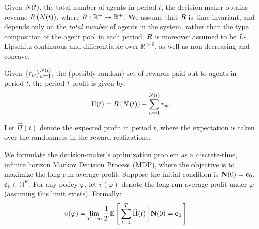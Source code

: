 \documentclass[12pt]{article}
\begin{document}
Given ${N}(t)$, the total number of agents in period $t$, the decision-maker obtains revenue $R\left({N}(t)\right)$, where $R:\mathbb{R}^+ \mapsto \mathbb{R}^+$. We assume that $R$ is time-invariant, and depends only on the {\it total number} of agents in the system, rather than the type composition of the agent pool in each period. $R$ is moreover assumed to be $L$-Lipschitz continuous and differentiable over $\mathbb{R}^{>0}$, as well as non-decreasing and concave.

Given $\{r_w\}_{w = 1}^{{N}(t)}$, the (possibly random) set of rewards paid out to agents in period $t$, the period-$t$ profit is given by:
$$\Pi(t) = R\left({N}(t)\right) - \sum_{w=1}^{{N}(t)} r_w.$$


Let $\widehat{\Pi}(t)$ denote the expected profit %
{in period} $t$, where the expectation is taken over the randomness in the reward realizations. 

We formulate the decision-maker's optimization problem as a discrete-time, infinite horizon Markov Decision Process (MDP), where the objective is to maximize the long-run average profit. Suppose the initial condition is ${\mathbf{N}}(0) = \mathbf{c}_0$, $\mathbf{c}_0 \in \mathbb{N}^K$. For any policy $\varphi$, let $v({\varphi})$ denote the long-run average profit under $\varphi$ (assuming this limit exists). Formally:
\begin{align*}
v(\varphi) =& \lim_{T\to \infty} \frac1T \mathbb{E}\left[\,\sum_{t=1}^T\widehat{\Pi}(t)\, \bigg{\vert} \, {\mathbf{N}}(0) = \mathbf{c}_0\,\right].
\end{align*}
\end{document}
